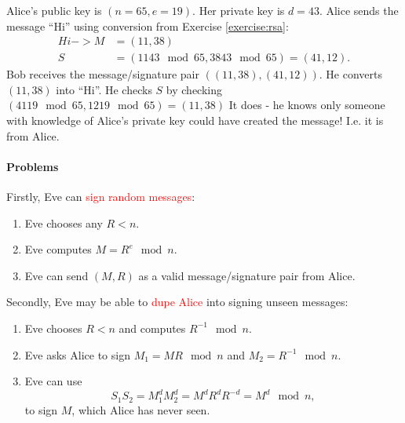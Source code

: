 \documentclass[a4paper, 11pt, openany]{book}
\numberwithin{equation}{section}
\theoremstyle{plain}
\theoremstyle{definition}
\newcommand{\Important}[1]{\textcolor{red}{#1}}
\begin{document}
Alice's public key is $(n = 65,e = 19)$. Her private key is $d = 43$. Alice sends the message ``Hi'' using conversion from Exercise \ref{exercise:rsa}:
\begin{align*}
    Hi -> M &= (11, 38)\\
    S &= (1143 \mod 65, 3843 \mod 65) = (41 , 12).
\end{align*}
Bob receives the message/signature pair $((11,38),(41,12))$.
He converts $(11,38)$ into ``Hi''.
He checks $S$ by checking $(4119 \mod 65,1219 \mod 65) = (11,38)$
It does - he knows only someone with knowledge of Alice's private key could have created the message! I.e. it is from Alice.



\paragraph{Problems}

Firstly, Eve can \Important{sign random messages}:
\begin{enumerate}
    \item Eve chooses any $R < n$.
    
    \item Eve computes $M = R^e \mod n$.
    
    \item Eve can send $(M,R)$ as a valid message/signature pair from Alice.
\end{enumerate}

Secondly, Eve may be able to \Important{dupe Alice} into signing unseen messages:
\begin{enumerate}
    \item Eve chooses $R < n$ and computes $R^{-1} \mod n$.
    
    \item Eve asks Alice to sign $M_1 = MR \mod n$ and $M_2 = R^{-1} \mod n$.
    
    \item Eve can use 
    \[
        S_1S_2 = M_1^d M_2^d = M^d R^d R^{-d} = M^d \mod n,
    \]
    to sign $M$, which Alice has never seen.
\end{enumerate}

\end{document}
